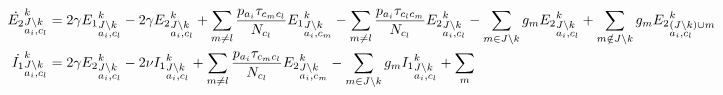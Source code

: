 \documentclass[12pt]{article}
\begin{document}
\begin{footnotesize}
\begin{align}
\dot{E_2}^k_{\begin{subarray}{l}J \setminus k\\ a_i, c_l \end{subarray}}
&=2 \gamma {E_1}^k_{\begin{subarray}{l}J \setminus k\\ a_i,
    c_l \end{subarray}} -2 \gamma {E_2}^k_{\begin{subarray}{l}J \setminus k\\ a_i, c_l \end{subarray}}
+\sum_{m\neq l} \frac{p_{a_i} \tau_{c_mc_l}}{N_{c_l}} {E_1}^k_{\begin{subarray}{l}J \setminus k\\ a_i,
    c_m \end{subarray}} -\sum_{m\neq l} \frac{p_{a_i}  \tau_{c_lc_m}}{N_{c_l}} {E_2}^k_{\begin{subarray}{l}J \setminus k\\ a_i,
    c_l \end{subarray}} -\sum_{m
  \in J \setminus k} g_m {E_2}^k_{\begin{subarray}{l}J \setminus k\\ a_i, c_l \end{subarray}} + \sum_{m
  \notin J \setminus k} g_m {E_2}^k_{\begin{subarray}{l} (J \setminus k) \cup m \\ a_i, c_l \end{subarray}}  \notag \\
\dot{I_1}^k_{\begin{subarray}{l}J \setminus k\\ a_i, c_l \end{subarray}} &=2 \gamma {E_2}^k_{\begin{subarray}{l}J \setminus k\\ a_i, c_l \end{subarray}}
-2 \nu {I_1}^k_{\begin{subarray}{l}J \setminus k\\ a_i,
    c_l \end{subarray}} + \sum_{m\neq l} \frac{p_{a_i} \tau_{c_mc_l}}{N_{c_l}} {E_2}^k_{\begin{subarray}{l}J \setminus k\\ a_i,
    c_m \end{subarray}}  -\sum_{m
  \in J \setminus k} g_m {I_1}^k_{\begin{subarray}{l}J \setminus k\\ a_i, c_l \end{subarray}} + \sum_{m
}
\end{align}
\end{footnotesize}
\end{document}
